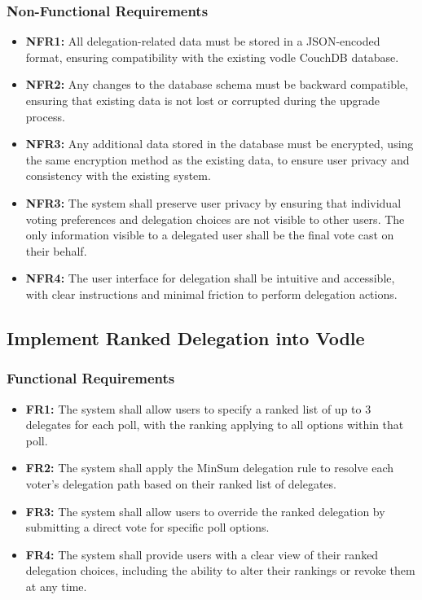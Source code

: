 \subsubsection{Non-Functional Requirements}
\begin{itemize}
    \item \textbf{NFR1:} All delegation-related data must be stored in a JSON-encoded format, ensuring compatibility with the existing vodle CouchDB database.
    \item \textbf{NFR2:} Any changes to the database schema must be backward compatible, ensuring that existing data is not lost or corrupted during the upgrade process.
    \item \textbf{NFR3:} Any additional data stored in the database must be encrypted, using the same encryption method as the existing data, to ensure user privacy and consistency with the existing system.
    \item \textbf{NFR3:} The system shall preserve user privacy by ensuring that individual voting preferences and delegation choices are not visible to other users. The only information visible to a delegated user shall be the final vote cast on their behalf.
    \item \textbf{NFR4:} The user interface for delegation shall be intuitive and accessible, with clear instructions and minimal friction to perform delegation actions.
\end{itemize}

\subsection{Implement Ranked Delegation into Vodle}

\subsubsection{Functional Requirements}
\begin{itemize}
    \item \textbf{FR1:} The system shall allow users to specify a ranked list of up to 3 delegates for each poll, with the ranking applying to all options within that poll.
    
    \item \textbf{FR2:} The system shall apply the MinSum delegation rule to resolve each voter's delegation path based on their ranked list of delegates.
    
    \item \textbf{FR3:} The system shall allow users to override the ranked delegation by submitting a direct vote for specific poll options.
    
    \item \textbf{FR4:} The system shall provide users with a clear view of their ranked delegation choices, including the ability to alter their rankings or revoke them at any time.
\end{itemize}

